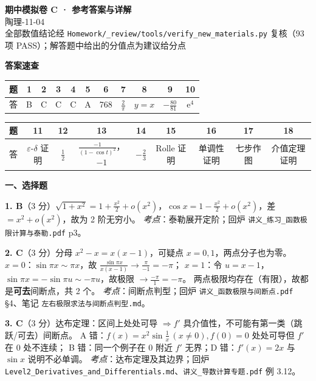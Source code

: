 \documentclass[11pt,a4paper]{ctexart}
\newcommand{\ee}{\mathrm{e}}
\begin{document}
\begin{center}
  {\LARGE\bfseries 期中模拟卷 C · 参考答案与详解}\\[4pt]
  {\large 陶理-11-04}\\[4pt]
  {\small 全部数值结论经 \texttt{Homework/\_review/tools/verify\_new\_materials.py} 复核（93 项 PASS）；解答题中给出的分值点为建议给分点}
\end{center}

\noindent\textbf{答案速查}
\begin{center}
\small\setlength{\tabcolsep}{4pt}
\begin{tabular}{c|cccccccccc}
\toprule
题 & 1 & 2 & 3 & 4 & 5 & 6 & 7 & 8 & 9 & 10 \\
\midrule
答 & B & C & C & C & A & 768 & $\frac2\pi$ & $y=x$ & $-\frac{80}{81}$ & $\ee^4$ \\
\bottomrule
\end{tabular}
\end{center}

\begin{center}
\small\setlength{\tabcolsep}{4pt}
\begin{tabular}{c|cccccccc}
\toprule
题 & 11 & 12 & 13 & 14 & 15 & 16 & 17 & 18 \\
\midrule
答 & $\varepsilon$-$\delta$ 证明 & $\frac12$ & $\frac{-1}{(1-\cos t)^2}$，$-1$ & $-\frac23$ & Rolle 证明 & 单调性证明 & 七步作图 & 介值定理证明 \\
\bottomrule
\end{tabular}
\end{center}

\bigskip
\noindent\textbf{一、选择题}

\textbf{1. B}（3 分）$\sqrt{1+x^2}=1+\frac{x^2}2+o(x^2)$，$\cos x=1-\frac{x^2}2+o(x^2)$，差 $=x^2+o(x^2)$，故为 2 阶无穷小。
\textit{考点}：泰勒展开定阶；回炉 \texttt{讲义\_练习\_函数极限计算与泰勒.pdf} p3。

\textbf{2. C}（3 分）分母 $x^2-x=x(x-1)$，可疑点 $x=0,1$，两点分子也为零。
$x=0$：$\sin\pi x\sim\pi x$，故 $\frac{\sin\pi x}{x(x-1)}\to\frac{\pi}{-1}=-\pi$；
$x=1$：令 $u=x-1$，$\sin\pi x=-\sin\pi u\sim-\pi u$，故极限 $\to\frac{-\pi}{1}=-\pi$。
两点极限均存在（有限），故都是\textbf{可去}间断点，共 2 个。
\textit{考点}：间断点判型；回炉 \texttt{讲义\_函数极限与间断点.pdf} §4、笔记 \texttt{左右极限求法与间断点判型.md}。

\textbf{3. C}（3 分）达布定理：区间上处处可导 $\Rightarrow f'$ 具介值性，不可能有第一类（跳跃/可去）间断点。
A 错：$f(x)=x^2\sin\frac1x\,(x\ne0),f(0)=0$ 处处可导但 $f'$ 在 0 处不连续；
B 错：同一个例子在 0 附近 $f'$ 无界；D 错：$f'(x)=2x$ 与 $\sin x$ 说明不必单调。
\textit{考点}：达布定理及其边界；回炉 \texttt{Level2\_Derivatives\_and\_Differentials.md}、\texttt{讲义\_导数计算专题.pdf} 例 3.12。
\end{document}
